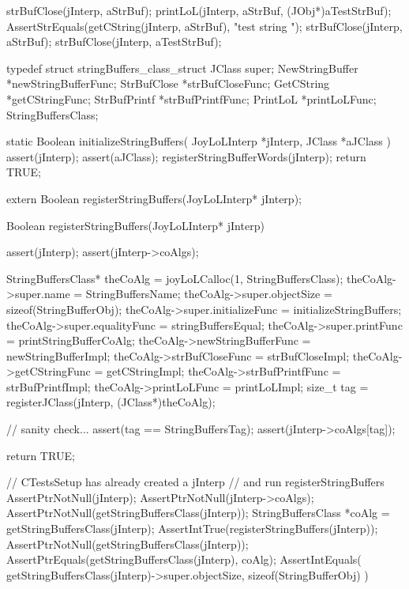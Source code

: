   strBufClose(jInterp, aStrBuf);
  printLoL(jInterp, aStrBuf, (JObj*)aTestStrBuf);
  AssertStrEquals(getCString(jInterp, aStrBuf), "test string ");
  strBufClose(jInterp, aStrBuf);
  strBufClose(jInterp, aTestStrBuf);
\stopCTest
\stopTestCase
\stopTestSuite

\startTestSuite[registerStringBuffers]

\startCHeader
typedef struct stringBuffers_class_struct {
  JClass       super;
  NewStringBuffer *newStringBufferFunc;
  StrBufClose     *strBufCloseFunc;
  GetCString      *getCStringFunc;
  StrBufPrintf    *strBufPrintfFunc;
  PrintLoL        *printLoLFunc;
} StringBuffersClass;
\stopCHeader

\startCCode
static Boolean initializeStringBuffers(
  JoyLoLInterp *jInterp,
  JClass   *aJClass
) {
  assert(jInterp);
  assert(aJClass);
  registerStringBufferWords(jInterp);
  return TRUE;
}
\stopCCode

\startCHeader
extern Boolean registerStringBuffers(JoyLoLInterp* jInterp);
\stopCHeader
{}

\startCCode
Boolean registerStringBuffers(JoyLoLInterp* jInterp) {
  assert(jInterp);
  assert(jInterp->coAlgs);
  
  StringBuffersClass* theCoAlg  =
    joyLoLCalloc(1, StringBuffersClass);
  theCoAlg->super.name            = StringBuffersName;
  theCoAlg->super.objectSize      = sizeof(StringBufferObj);
  theCoAlg->super.initializeFunc  = initializeStringBuffers;
  theCoAlg->super.equalityFunc    = stringBuffersEqual;
  theCoAlg->super.printFunc       = printStringBufferCoAlg;
  theCoAlg->newStringBufferFunc   = newStringBufferImpl;
  theCoAlg->strBufCloseFunc       = strBufCloseImpl;
  theCoAlg->getCStringFunc        = getCStringImpl;
  theCoAlg->strBufPrintfFunc      = strBufPrintfImpl;
  theCoAlg->printLoLFunc          = printLoLImpl;
  size_t tag =
    registerJClass(jInterp, (JClass*)theCoAlg);
  
  // sanity check...
  assert(tag == StringBuffersTag);
  assert(jInterp->coAlgs[tag]);

  return TRUE;
}
\stopCCode


\startCTest
  // CTestsSetup has already created a jInterp
  // and run registerStringBuffers
  AssertPtrNotNull(jInterp);
  AssertPtrNotNull(jInterp->coAlgs);
  AssertPtrNotNull(getStringBuffersClass(jInterp));
  StringBuffersClass *coAlg =
    getStringBuffersClass(jInterp);
  AssertIntTrue(registerStringBuffers(jInterp));
  AssertPtrNotNull(getStringBuffersClass(jInterp));
  AssertPtrEquals(getStringBuffersClass(jInterp), coAlg);
  AssertIntEquals(
    getStringBuffersClass(jInterp)->super.objectSize,
    sizeof(StringBufferObj)
  )
\stopCTest
\stopTestCase
\stopTestSuite
